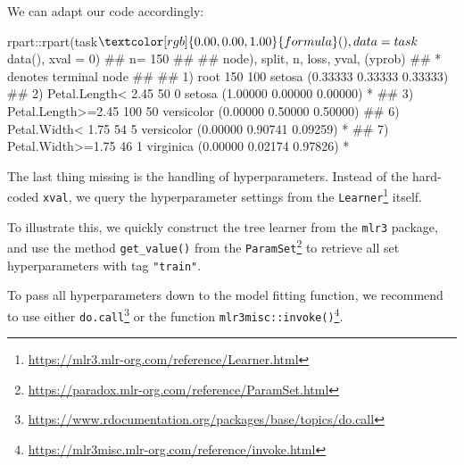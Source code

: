 \documentclass[12pt,]{scrbook}
\newenvironment{Shaded}{}{}
\newcommand{\DataTypeTok}[1]{#1}
\newcommand{\DecValTok}[1]{#1}
\newcommand{\KeywordTok}[1]{\textcolor[rgb]{0.00,0.00,1.00}{#1}}
\newcommand{\NormalTok}[1]{#1}
\newcommand{\OperatorTok}[1]{#1}
\newcommand{\StringTok}[1]{\textcolor[rgb]{0.00,0.50,0.50}{#1}}
\renewcommand{\href}[2]{#2\footnote{\url{#1}}}
\begin{document}
We can adapt our code accordingly:

\begin{Shaded}
\begin{Highlighting}[]
\NormalTok{rpart}\OperatorTok{::}\KeywordTok{rpart}\NormalTok{(task}\OperatorTok{$}\KeywordTok{formula}\NormalTok{(), }\DataTypeTok{data =}\NormalTok{ task}\OperatorTok{$}\KeywordTok{data}\NormalTok{(), }\DataTypeTok{xval =} \DecValTok{0}\NormalTok{)}
\NormalTok{## n= 150 }
\NormalTok{## }
\NormalTok{## node), split, n, loss, yval, (yprob)}
\NormalTok{##       * denotes terminal node}
\NormalTok{## }
\NormalTok{## 1) root 150 100 setosa (0.33333 0.33333 0.33333)  }
\NormalTok{##   2) Petal.Length< 2.45 50   0 setosa (1.00000 0.00000 0.00000) *}
\NormalTok{##   3) Petal.Length>=2.45 100  50 versicolor (0.00000 0.50000 0.50000)  }
\NormalTok{##     6) Petal.Width< 1.75 54   5 versicolor (0.00000 0.90741 0.09259) *}
\NormalTok{##     7) Petal.Width>=1.75 46   1 virginica (0.00000 0.02174 0.97826) *}
\end{Highlighting}
\end{Shaded}

The last thing missing is the handling of hyperparameters.
Instead of the hard-coded \texttt{xval}, we query the hyperparameter settings from the \href{https://mlr3.mlr-org.com/reference/Learner.html}{\texttt{Learner}} itself.

To illustrate this, we quickly construct the tree learner from the \texttt{mlr3} package, and use the method \texttt{get\_value()} from the \href{https://paradox.mlr-org.com/reference/ParamSet.html}{\texttt{ParamSet}} to retrieve all set hyperparameters with tag \texttt{"train"}.

\begin{Shaded}
\end{Shaded}

To pass all hyperparameters down to the model fitting function, we recommend to use either \href{https://www.rdocumentation.org/packages/base/topics/do.call}{\texttt{do.call}} or the function \href{https://mlr3misc.mlr-org.com/reference/invoke.html}{\texttt{mlr3misc::invoke()}}.
\end{document}
